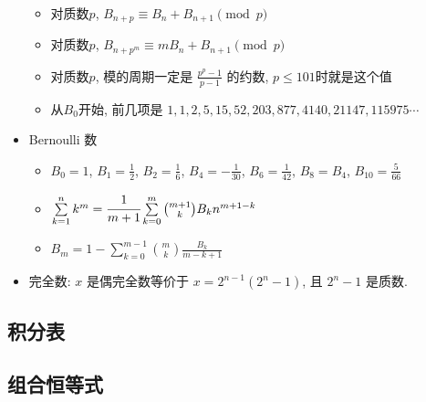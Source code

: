 \documentclass[landscape,a4paper]{article}
\begin{document}
\begin{spacing}{0.3}
\begin{multicols}{2}
\begin{itemize}
\begin{itemize}
  \item 对质数$p$, $B_{n + p} \equiv B_n + B_{n + 1} \pmod{p}$
  \item 对质数$p$, $B_{n + p^m} \equiv mB_n + B_{n + 1} \pmod{p}$
  \item 对质数$p$, 模的周期一定是 $\frac{p^p - 1}{p - 1}$ 的约数, $p \le 101$时就是这个值
  \item 从$B_0$开始, 前几项是 $1, 1, 2, 5, 15, 52, 203, 877, 4140, 21147, 115975 \cdots$
  \end{itemize}
\item Bernoulli 数
  \begin{itemize}
  \item $B_0 = 1$, $B_1 = \frac{1}{2}$, $B_2 = \frac{1}{6}$, $B_4 = -\frac{1}{30}$, $B_6 = \frac{1}{42}$, $B_8 = B_4$, $B_{10} = \frac{5}{66}$
  \item $\sum\limits_{k = 1}^{n} k^m = \cfrac{1}{m + 1} \sum\limits_{k = 0}^{m} \binom{m + 1}{k} B_k n ^ {m + 1 - k} $
  \item $B_m = 1 - \sum\limits_{k = 0}^{m - 1} \binom{m}{k} \frac{B_k}{m - k + 1}$
  \end{itemize}
\item 完全数: $x$ 是偶完全数等价于 $x = 2^{n - 1} (2^n - 1)$, 且 $2^n - 1$ 是质数.
\end{itemize}
\end{multicols}

\begin{multicols}{4}
\newcommand{\ud}{\mathrm{d}}
\subsection{积分表}

\end{multicols}

\subsection{组合恒等式}




	\end{spacing}
\end{document}
